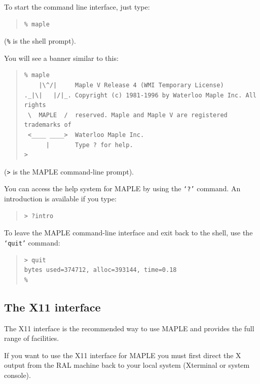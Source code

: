 \documentclass[twoside,11pt]{article}
\newcommand{\xlabel}[1]{}
\begin{document}
To start the command line interface, just type:

\begin{quote}\begin{verbatim}
% maple
\end{verbatim}\end{quote}

(\texttt{\%} is the shell prompt).

You will see a banner similar to this:

\begin{quote}\begin{verbatim}
% maple
    |\^/|     Maple V Release 4 (WMI Temporary License)
._|\|   |/|_. Copyright (c) 1981-1996 by Waterloo Maple Inc. All rights
 \  MAPLE  /  reserved. Maple and Maple V are registered trademarks of
 <____ ____>  Waterloo Maple Inc.
      |       Type ? for help.
>
\end{verbatim}\end{quote}

(\verb+>+ is the MAPLE command-line prompt).

You can access the help system for MAPLE by using the \texttt{`?'} command.
An introduction is available if you type:

\begin{quote}\begin{verbatim}
> ?intro
\end{verbatim}\end{quote}

To leave the MAPLE command-line interface and exit back to the shell,
use the \texttt{`quit'} command:

\begin{quote}\begin{verbatim}
> quit
bytes used=374712, alloc=393144, time=0.18
%
\end{verbatim}\end{quote}

\subsection{\xlabel{the_X11_interface}The X11 interface}

The X11 interface is the recommended way to use MAPLE and provides the full
range of facilities.

If you want to use the X11 interface for MAPLE you must first direct
the X output from the RAL machine back to your local system (Xterminal or
system console).
\end{document}
